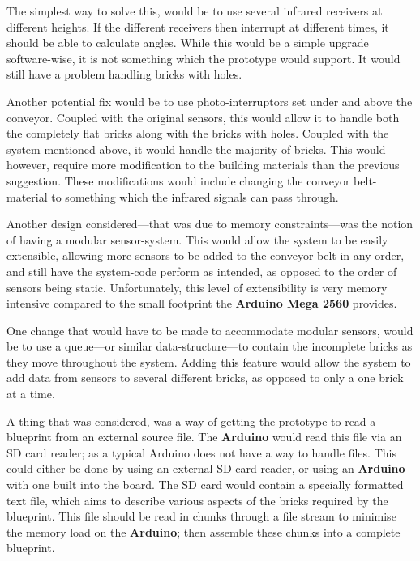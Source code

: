 The simplest way to solve this, would be to use several infrared receivers at different heights.
If the different receivers then interrupt at different times, it should be able to calculate angles.
While this would be a simple upgrade software-wise, it is not something which the prototype would support.
It would still have a problem handling bricks with holes.

Another potential fix would be to use photo-interruptors set under and above the conveyor. 
Coupled with the original sensors, this would allow it to handle both the completely flat bricks along with the bricks with holes.
Coupled with the system mentioned above, it would handle the majority of bricks.
This would however, require more modification to the building materials than the previous suggestion.
These modifications would include changing the conveyor belt-material to something which the infrared signals can pass through.

Another design considered---that was due to memory constraints---was the notion of having a modular sensor-system.
This would allow the system to be easily extensible, allowing more sensors to be added to the conveyor belt in any order, and still have the system-code perform as intended, as opposed to the order of sensors being static. %
Unfortunately, this level of extensibility is very memory intensive compared to the small footprint the \textbf{Arduino Mega 2560} provides.

One change that would have to be made to accommodate modular sensors, would be to use a queue---or similar data-structure---to contain the incomplete bricks as they move throughout the system.
Adding this feature would allow the system to add data from sensors to several different bricks, as opposed to only a one brick at a time.

A thing that was considered, was a way of getting the prototype to read a blueprint from an external source file.
The \textbf{Arduino} would read this file via an SD card reader; as a typical Arduino does not have a way to handle files.
This could either be done by using an external SD card reader, or using an \textbf{Arduino} with one built into the board.
The SD card would contain a specially formatted text file, which aims to describe various aspects of the bricks required by the blueprint.
This file should be read in chunks through a file stream to minimise the memory load on the \textbf{Arduino}; then assemble these chunks into a complete blueprint.

